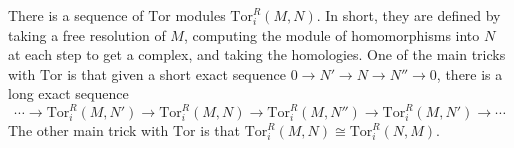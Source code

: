 \documentclass[12pt]{amsart}
\begin{document}
There is a sequence of $\mathrm{Tor}$ modules $\mathrm{Tor}_i^R(M,N)$. In short, they are defined by taking a free resolution of $M$, computing the module of homomorphisms into $N$ at each step to get a complex, and taking the homologies.
One of the main tricks with $\mathrm{Tor}$ is that given a short exact sequence ${0\to N' \to N \to N'' \to 0}$, there is a long exact sequence
\[ \cdots \to \mathrm{Tor}_i^R(M,N') \to \mathrm{Tor}_i^R(M,N) \to \mathrm{Tor}_i^R(M,N'') \to \mathrm{Tor}_i^R(M,N') \to \cdots\]
The other main trick with $\mathrm{Tor}$ is that $\mathrm{Tor}_i^R(M,N)\cong \mathrm{Tor}_i^R(N,M)$.



	
\end{document}
